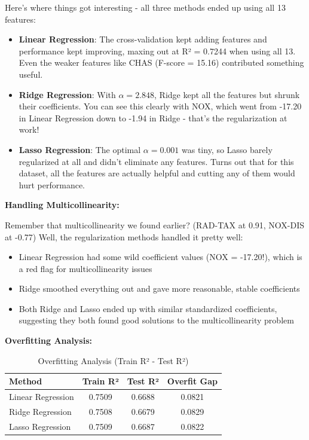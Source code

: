 \documentclass[12pt]{article}
\begin{document}
Here's where things got interesting - all three methods ended up using all 13 features:

\begin{itemize}
    \item \textbf{Linear Regression}: The cross-validation kept adding features and 
    performance kept improving, maxing out at R² = 0.7244 when using all 13. Even the 
    weaker features like CHAS (F-score = 15.16) contributed something useful.
    
    \item \textbf{Ridge Regression}: With $\alpha = 2.848$, Ridge kept all the features 
    but shrunk their coefficients. You can see this clearly with NOX, which went from 
    -17.20 in Linear Regression down to -1.94 in Ridge - that's the regularization at work!
    
    \item \textbf{Lasso Regression}: The optimal $\alpha = 0.001$ was tiny, so Lasso 
    barely regularized at all and didn't eliminate any features. Turns out that for 
    this dataset, all the features are actually helpful and cutting any of them would 
    hurt performance.
\end{itemize}

\textbf{Handling Multicollinearity:}

Remember that multicollinearity we found earlier? (RAD-TAX at 0.91, NOX-DIS at -0.77) 
Well, the regularization methods handled it pretty well:

\begin{itemize}
    \item Linear Regression had some wild coefficient values (NOX = -17.20!), which is 
    a red flag for multicollinearity issues
    \item Ridge smoothed everything out and gave more reasonable, stable coefficients
    \item Both Ridge and Lasso ended up with similar standardized coefficients, suggesting 
    they both found good solutions to the multicollinearity problem
\end{itemize}

\textbf{Overfitting Analysis:}

\begin{table}[H]
\centering
\begin{tabular}{|l|c|c|c|}
\hline
\textbf{Method} & \textbf{Train R²} & \textbf{Test R²} & \textbf{Overfit Gap} \\
\hline
Linear Regression & 0.7509 & 0.6688 & 0.0821 \\
Ridge Regression & 0.7508 & 0.6679 & 0.0829 \\
Lasso Regression & 0.7509 & 0.6687 & 0.0822 \\
\hline
\end{tabular}
\caption{Overfitting Analysis (Train R² - Test R²)}
\label{tab:overfit}
\end{table}
\end{document}
